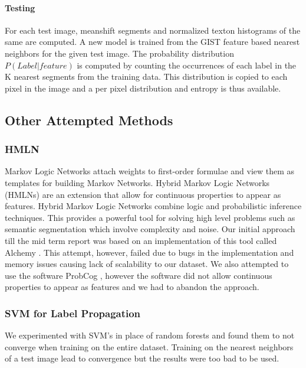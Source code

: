 \documentclass{article} %
\begin{document}
\paragraph{Testing} For each test image, meanshift segments and normalized texton histograms of the same are computed.
A new model is trained from the GIST feature based nearest neighbors for the given test image.
The probability distribution $P(Label | feature)$ is computed by counting the occurrences of each label in the K nearest segments from the training data.
This distribution is copied to each pixel in the image and a per pixel distribution and entropy is thus available.

\subsection{Other Attempted Methods}
\subsubsection{HMLN}
Markov Logic Networks \cite{Domingos06unifyinglogical} \cite{Richardson06markovlogic} attach weights to first-order formulae and view them as templates for building Markov Networks. Hybrid Markov Logic Networks (HMLNs)\cite{Wang_hybridmarkov} are an extension that allow for continuous properties to appear as features. Hybrid Markov Logic Networks combine logic and probabilistic inference techniques. This provides a powerful tool for solving high level problems such as semantic segmentation which involve complexity and noise. Our initial approach till the mid term report was based on an implementation of this tool called Alchemy \cite{alchemy}. This attempt, however, failed due to bugs in the implementation and memory issues causing lack of scalability to our dataset. We also attempted to use the software ProbCog \cite{conf/ifiptm/NoorianMF11}, however the software did not allow continuous properties to appear as features and we had to abandon the approach. 

\subsubsection{SVM for Label Propagation}
We experimented with SVM's in place of random forests and found them to not converge when training on the entire dataset. Training on the nearest neighbors of a test image lead to convergence but the results were too bad to be used.
\end{document}
